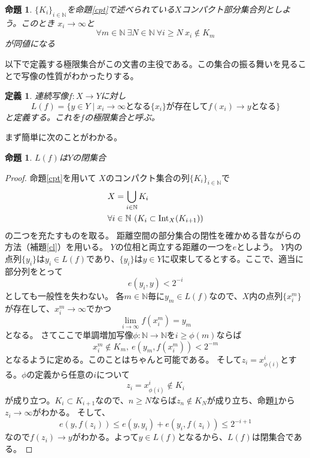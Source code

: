 \documentclass[leqno]{jsarticle}
\newtheorem{prop}[thm]{命題}
\newtheorem{df}[thm]{定義}
\newcommand{\nn}{\mathbb{N}}
\newcommand{\nai}{\text{{\rm Int}}}
\begin{document}
\begin{prop}\label{benri}
$\{K_i\}_{i\in \nn}$を命題\ref{cpt}で述べられている$X$コンパクト部分集合列としよう。このとき
$x_i\to \infty$と
\[
\forall m\in \nn \ \exists N\in \nn\ \forall i\ge N\ x_i\not\in K_m
\]
が同値になる
\end{prop}
以下で定義する極限集合がこの文書の主役である。この集合の振る舞いを見ることで写像の性質がわかったりする。
\begin{df}
連続写像$f:X\to Y$に対し
\[
L(f)=\{y\in Y\mid \text{$x_i\to \infty$となる$\{x_i\}$が存在して$f(x_i)\to y$となる}\}
\]
と定義する。これを$f$の\emph{極限集合}と呼ぶ。
\end{df}
まず簡単に次のことがわかる。
\begin{prop}
$L(f)$は$Y$の閉集合
\end{prop}
\begin{proof}
命題\ref{cpt}を用いて
$X$のコンパクト集合の列$\{K_i\}_{i\in \nn}$で
\begin{align*}
& X=\bigcup_{i\in \nn}K_i\\
& \forall i\in \nn\ (K_i\subset \nai_X(K_{i+1}))
\end{align*}
の二つを充たすものを取る。
距離空間の部分集合の閉性を確かめる昔ながらの方法（補題\ref{cl}）を用いる。
$Y$の位相と両立する距離の一つを$e$としよう。
$Y$内の点列$\{y_i\}$は$y_i\in L(f)$であり、$\{y_i\}$は$y\in Y$に収束してるとする。ここで、適当に部分列をとって
\[
e(y_i,y)<2^{-i}
\]
としても一般性を失わない。
各$m\in \nn$毎に$y_m\in L(f)$なので、$X$内の点列$\{x_i^m\}$が存在して、$x_{i}^m\to \infty$でかつ
\[
\lim_{i\to \infty}f(x_i^m)=y_m
\]
となる。
さてここで単調増加写像$\phi:\nn\to\nn$を$i\ge \phi(m)$ならば
\[
x_{i}^m\not\in K_m,\ e(y_m,f(x_i^m))<2^{-m}
\]
となるように定める。このことはちゃんと可能である。
そして$z_i=x_{\phi(i)}^{i}$とする。$\phi$の定義から任意の$i$について
\[
z_i=x_{\phi(i)}^{i}\not\in K_i
\]
が成り立つ。$K_i \subset K_{i+1}$なので、$n\ge N$ならば$z_n\not\in K_N$が成り立ち、命題\ref{benri}から$z_i\to \infty$がわかる。
そして、
\[
e(y,f(z_i))\le e(y,y_i)+e(y_i,f(z_i))\le 2^{-i+1}
\]
なので$f(z_i)\to y$がわかる。よって$y\in L(f)$となるから、$L(f)$は閉集合である。
\end{proof}
\end{document}
